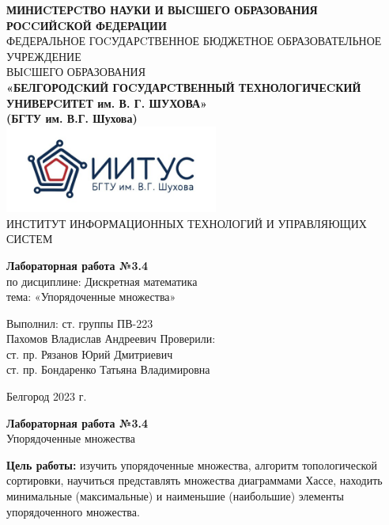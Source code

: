 \documentclass[a4paper,14pt]{extarticle}
\newcommand\textbox[1]{
	\parbox{.45\textwidth}{#1}
}
\begin{document}
\begin{center}
    \small{
        \textbf{МИНИCТЕРCТВО НАУКИ И ВЫCШЕГО ОБРАЗОВАНИЯ РОCCИЙCКОЙ ФЕДЕРАЦИИ}\\
        ФЕДЕРАЛЬНОЕ ГОCУДАРCТВЕННОЕ БЮДЖЕТНОЕ ОБРАЗОВАТЕЛЬНОЕ УЧРЕЖДЕНИЕ\\ВЫCШЕГО ОБРАЗОВАНИЯ \\
        \textbf{«БЕЛГОРОДCКИЙ ГОCУДАРCТВЕННЫЙ ТЕХНОЛОГИЧЕCКИЙ\\УНИВЕРCИТЕТ им. В. Г. ШУХОВА»\\ (БГТУ им. В.Г. Шухова)} \\
        \bigbreak
        \includegraphics[width=70mm]{log}\\
        ИНСТИТУТ ИНФОРМАЦИОННЫХ ТЕХНОЛОГИЙ И УПРАВЛЯЮЩИХ СИСТЕМ\\}
\end{center}

\vfill
\begin{center}
    \large{
        \textbf{
            Лабораторная работа №3.4}}\\
    \normalsize{
        по дисциплине: Дискретная математика \\
        тема: «Упорядоченные множества»}
\end{center}
\vfill
\hfill\textbox{
    Выполнил: ст. группы ПВ-223\\Пахомов Владислав Андреевич
    \bigbreak
    Проверили: \\ст. пр. Рязанов Юрий Дмитриевич\\
    ст. пр. Бондаренко Татьяна Владимировна
}
\vfill\begin{center}
    Белгород 2023 г.
\end{center}
\newpage
\begin{center}
    \textbf{Лабораторная работа №3.4}\\
    Упорядоченные множества
\end{center}
\textbf{Цель работы: }изучить упорядоченные множества, алгоритм
топологической сортировки, научиться представлять
множества диаграммами Хассе, находить минимальные
(максимальные) и наименьшие (наибольшие) элементы
упорядоченного множества.
\end{document}
